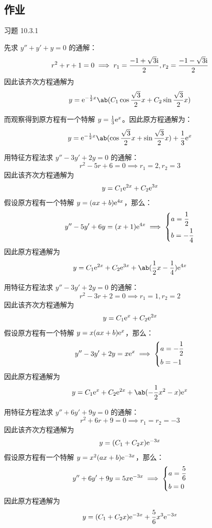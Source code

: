 \subsection{作业}

\begin{problem}
    习题 10.3.1
    \begin{solution}
        \item[\textbf{1)}] 先求 $y'' + y' + y = 0$ 的通解：
        $$
        r^2 + r + 1 = 0 \implies r_1 = \frac{-1 + \sqrt{3} \mathrm{i}}{2}, r_2 = \frac{-1 - \sqrt{3} \mathrm{i}}{2}
        $$
        因此该齐次方程通解为
        $$
        y = \E^{-\frac{1}{2} x} \ab(C_1 \cos \frac{\sqrt{3}}{2} x + C_2 \sin \frac{\sqrt{3}}{2} x)
        $$

        而观察得到原方程有一个特解 $y = \frac{1}{3} \mathrm{e}^{x}$。因此原方程通解为：
        $$
        y = \E^{-\frac{1}{2} x} \ab(\cos \frac{\sqrt{3}}{2} x + \sin \frac{\sqrt{3}}{2} x) + \frac{1}{3} \E^{x}
        $$

        \item[\textbf{2)}] 用特征方程法求 $y'' - 3y' + 2y = 0$ 的通解：
        $$
        r^2 - 5r + 6 = 0 \implies r_1 = 2, r_2 = 3
        $$
        因此该齐次方程通解为
        $$
        y = C_1 \mathrm{e}^{2x} + C_2 \mathrm{e}^{3x}
        $$
        假设原方程有一个特解 $y = (a x + b) \mathrm{e}^{4 x}$，那么：
        $$
        y'' - 5 y' + 6y = (x + 1) \mathrm{e}^{4x} \implies 
        \begin{dcases}
            a = \frac{1}{2} \\
            b = -\frac{1}{4}
        \end{dcases}
        $$
        因此原方程通解为
        $$
        y = C_1 \E^{2x} + C_2 \E^{3x} + \ab(\frac{1}{2} x - \frac{1}{4}) \E^{4x}
        $$

        \item[\textbf{3)}] 用特征方程法求 $y'' - 3y' + 2y = 0$ 的通解：
        $$
        r^2 - 3r + 2 = 0 \implies r_1 = 1, r_2 = 2
        $$
        因此该齐次方程通解为
        $$
        y = C_1 \mathrm{e}^{x} + C_2 \mathrm{e}^{2x}
        $$
        假设原方程有一个特解 $y = x (a x + b) \mathrm{e}^{x}$，那么：
        $$
        y'' - 3 y' + 2y = x \mathrm{e}^{x} \implies \begin{dcases}
            a = -\frac{1}{2} \\
            b = -1
        \end{dcases}
        $$
        因此原方程通解为
        $$
        y = C_1 \E^{x} + C_2 \E^{2x} + \ab(-\frac{1}{2} x^2 - x) \E^{x}
        $$

        \item[\textbf{4)}] 用特征方程法求 $y'' + 6y' + 9y = 0$ 的通解：
        $$
        r^2 + 6r + 9 = 0 \implies r_1 = r_2 = -3
        $$
        因此该齐次方程通解为
        $$
        y = (C_1 + C_2 x) \mathrm{e}^{-3x}
        $$
        假设原方程有一个特解 $y = x^2 (a x + b) \mathrm{e}^{-3x}$，那么：
        $$
        y'' + 6y' + 9y = 5x \mathrm{e}^{-3x} \implies \begin{dcases}
            a = \frac{5}{6} \\
            b = 0
        \end{dcases}
        $$
        因此原方程通解为
        $$
        y = (C_1 + C_2 x) \mathrm{e}^{-3x} + \frac{5}{6} x^3 \mathrm{e}^{-3x}
        $$


\end{solution}
\end{problem}
